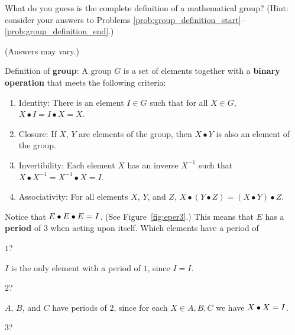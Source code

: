 \documentclass[../gatm_answers.tex]{subfiles}
\begin{document}
\begin{outer_problem}
	\item What do you guess is the complete definition of a mathematical group?
	      (Hint: consider your answers to Problems \ref{prob:group_definition_start}--\ref{prob:group_definition_end}.)
\end{outer_problem}

(Answers may vary.)

Definition of \textbf{group}: A group $G$ is a set of elements together with a \textbf{binary operation} that meets the following criteria:
\begin{enumerate}[label=(\alph*)]
\item Identity: There is an element $I\in G$ such that for all $X\in G$, $X\bullet I = I\bullet X = X$.
\item Closure: If $X$, $Y$ are elements of the group, then $X\bullet Y$ is also an element of the group.
\item Invertibility: Each element $X$ has an inverse $X^{-1}$ such that $X\bullet X^{-1} = X^{-1}\bullet X = I$.
\item Associativity: For all elements $X$, $Y$, and $Z$, $X\bullet (Y\bullet Z) = (X\bullet Y) \bullet Z$.
\end{enumerate}

\begin{outer_problem}
	\item Notice that $E\bullet E\bullet E=I$. (See Figure~\ref{fig:eper3}.)
	      This means that $E$ has a \textbf{period} of $3$ when acting upon itself.
	      Which elements have a period of
\end{outer_problem}

\begin{inner_problem}[start=1]
	 \item $1$?
\end{inner_problem}

$I$ is the only element with a period of $1$, since $I=I$.

\begin{inner_problem}
	 \item $2$?
\end{inner_problem}

$A$, $B$, and $C$ have periods of $2$, since for each $X\in{A,B,C}$ we have $X\bullet X = I$.

\begin{inner_problem}
	 \item $3$?
\end{inner_problem}
\end{document}
